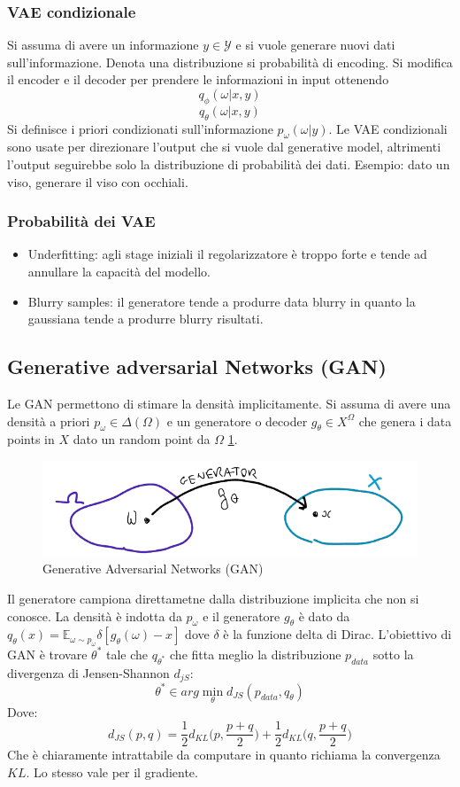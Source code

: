 \subsubsection{VAE condizionale}
Si assuma di avere un informazione $y\in\mathcal{Y}$ e si vuole generare nuovi dati sull'informazione.
Denota una distribuzione si probabilit\`a di encoding.
Si modifica il encoder e il decoder per prendere le informazioni in input ottenendo
$$q_\phi(\omega|x,y)$$
$$q_\theta(\omega|x,y)$$
Si definisce i priori condizionati sull'informazione $p_\omega(\omega|y)$.
Le VAE condizionali sono usate per direzionare l'output che si vuole dal generative model, altrimenti l'output seguirebbe solo la distribuzione di probabilit\`a dei dati. Esempio: dato un viso, generare il viso con occhiali.

\subsubsection{Probabilit\`a dei VAE}
\begin{itemize}
	\item Underfitting: agli stage iniziali il regolarizzatore \`e troppo forte e tende ad annullare la capacit\`a del modello.
	\item Blurry samples: il generatore tende a produrre data blurry in quanto la gaussiana tende a produrre blurry risultati.
\end{itemize}

\subsection{Generative adversarial Networks (GAN)}
Le GAN permettono di stimare la densit\`a implicitamente.
Si assuma di avere una densit\`a a priori $p_\omega\in\Delta(\Omega)$ e un generatore o decoder $g_\theta\in X^\Omega$ che genera i data points in $X$ dato un random point da $\Omega$ \ref{fig:chapter12-15}.
\begin{figure}
	\centering
	\includegraphics[width=0.6\linewidth]{imgs/chapter12/img15}
	\caption{Generative Adversarial Networks (GAN)}
	\label{fig:chapter12-15}
\end{figure}
Il generatore campiona direttametne dalla distribuzione implicita che non si conosce.
La densit\`a \`e indotta da $p_\omega$ e il generatore $g_\theta$ \`e dato da $q_\theta(x) = \mathbb{E}_{\omega\sim p_\omega}\delta[g_\theta(\omega) - x]$ dove $\delta$ \`e la funzione delta di Dirac.
L'obiettivo di GAN \`e trovare $\theta^*$ tale che $q_{\theta^*}$ che fitta meglio la distribuzione $p_{data}$ sotto la divergenza di Jensen-Shannon $d_{jS}$:
$$\theta^*\in arg\min\limits_{\theta} d_{JS}(p_{data},q_\theta)$$
Dove:
$$d_{JS}(p,q) = \frac{1}{2}d_{KL}\bigl(p,\frac{p+q}{2}\bigr)+\frac{1}{2}d_{KL}\bigl(q,\frac{p+q}{2}\bigr)$$
Che \`e chiaramente intrattabile da computare in quanto richiama la convergenza $KL$.
Lo stesso vale per il gradiente.

